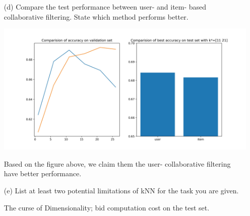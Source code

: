 \begin{itemize}
	\item [(d)] Compare the test performance between user- and item- based collaborative filtering. State which method performs better.
	\begin{center}
		\includegraphics[scale=0.6]{../out/KNN_compare.jpg}
	\end{center}
	Based on the figure above, we claim them the user- collaborative filtering have better performance.
		\item [(e)] List at least two potential limitations of kNN for the task you are given.
		
		The curse of Dimensionality; bid computation cost on the test set.	
\end{itemize}